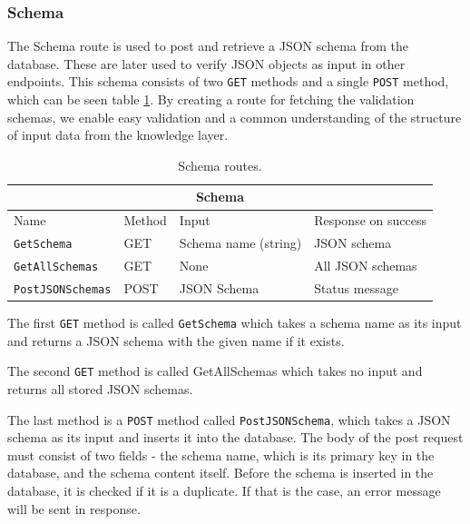 \subsubsection{Schema}
The Schema route is used to post and retrieve a JSON schema from the database. These are later used to verify JSON objects as input in other endpoints. 
This schema consists of two \texttt{GET} methods and a single \texttt{POST} method, which can be seen table \ref{SchemaRoutes}.
By creating a route for fetching the validation schemas, we enable easy validation and a common understanding of the structure of input data from the knowledge layer.
\begin{table}[h]
  \centering
    \begin{tabular}{|llll|}
    \hline
    \multicolumn{4}{|c|}{\textbf{Schema}}                                                                                                     \\ \hline
    \multicolumn{1}{|l|}{Name}                     & \multicolumn{1}{l|}{Method} & \multicolumn{1}{l|}{Input}               & Response on success \\ \hline
    \multicolumn{1}{|l|}{\texttt{GetSchema}}       & \multicolumn{1}{l|}{GET}    & \multicolumn{1}{l|}{Schema name (string)} & JSON schema         \\ \hline
    \multicolumn{1}{|l|}{\texttt{GetAllSchemas}}   & \multicolumn{1}{l|}{GET}    & \multicolumn{1}{l|}{None}                & All JSON schemas    \\ \hline
    \multicolumn{1}{|l|}{\texttt{PostJSONSchemas}} & \multicolumn{1}{l|}{POST}   & \multicolumn{1}{l|}{JSON Schema}         & Status message      \\ \hline
    \end{tabular}
    \caption{Schema routes\label{SchemaRoutes}.}
\end{table}

The first \texttt{GET} method is called \texttt{GetSchema} which takes a schema name as its input and returns a JSON schema with the given name if it exists. 

The second \texttt{GET} method is called GetAllSchemas which takes no input and returns all stored JSON schemas. 

The last method is a \texttt{POST} method called \texttt{PostJSONSchema}, which takes a JSON schema as its input and inserts it into the database.
The body of the post request must consist of two fields - the schema name, which is its primary key in the database, and the schema content itself. Before the schema is inserted in the database, it is checked if it is a duplicate. If that is the case, an error message will be sent in response.